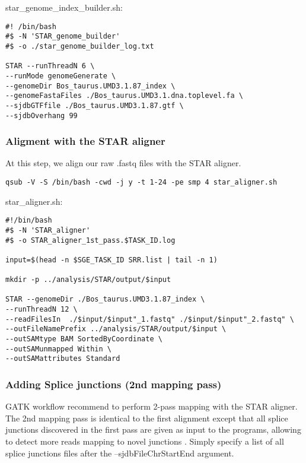 \noindent star\_genome\_index\_builder.sh:
\begin{verbatim}
#! /bin/bash
#$ -N 'STAR_genome_builder'
#$ -o ./star_genome_builder_log.txt

STAR --runThreadN 6 \
--runMode genomeGenerate \
--genomeDir Bos_taurus.UMD3.1.87_index \
--genomeFastaFiles ./Bos_taurus.UMD3.1.dna.toplevel.fa \
--sjdbGTFfile ./Bos_taurus.UMD3.1.87.gtf \
--sjdbOverhang 99
\end{verbatim}



\subsubsection{Aligment with the STAR aligner}

At this step, we align our raw .fastq files with the STAR aligner.

\begin{verbatim}
qsub -V -S /bin/bash -cwd -j y -t 1-24 -pe smp 4 star_aligner.sh
\end{verbatim}


\noindent star\_aligner.sh:
\begin{verbatim}
#!/bin/bash
#$ -N 'STAR_aligner'
#$ -o STAR_aligner_1st_pass.$TASK_ID.log

input=$(head -n $SGE_TASK_ID SRR.list | tail -n 1)

mkdir -p ../analysis/STAR/output/$input

STAR --genomeDir ./Bos_taurus.UMD3.1.87_index \
--runThreadN 12 \
--readFilesIn  ./$input/$input"_1.fastq" ./$input/$input"_2.fastq" \
--outFileNamePrefix ../analysis/STAR/output/$input \
--outSAMtype BAM SortedByCoordinate \
--outSAMunmapped Within \
--outSAMattributes Standard
\end{verbatim}



\subsubsection{Adding Splice junctions (2nd mapping pass)}

GATK workflow recommend to perform 2-pass mapping with the STAR aligner. The 2nd mapping pass is identical to the first alignment except that all splice junctions discovered in the first pass are given as input to the programs, allowing to detect more reads mapping to novel junctions  \cite{Dobin2013}. Simply specify a list of all splice junctions files after the --sjdbFileChrStartEnd argument.


